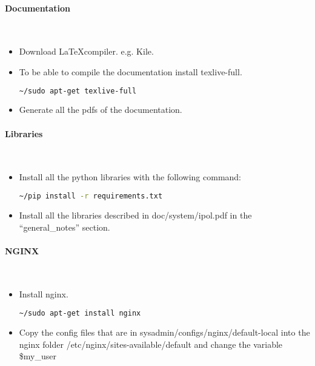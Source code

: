 \paragraph{Documentation} \hspace{0pt} \\
\begin{itemize}
 \item Download \LaTeX compiler. e.g. Kile.
 \item To be able to compile the documentation install texlive-full.
  \begin{lstlisting}[language=Bash]
  ~/sudo apt-get texlive-full
  \end{lstlisting}
 \item Generate all the pdfs of the documentation.
\end{itemize}

\paragraph{Libraries} \hspace{0pt} \\
\begin{itemize}
 \item Install all the python libraries with the following command:
  \begin{lstlisting}[language=Bash]
  ~/pip install -r requirements.txt
  \end{lstlisting}
 \item Install all the libraries described in doc/system/ipol.pdf in the ``general\_notes'' section.
\end{itemize}

\paragraph{NGINX} \hspace{0pt} \\
\begin{itemize}
 \item Install nginx.
  \begin{lstlisting}[language=Bash]
  ~/sudo apt-get install nginx
  \end{lstlisting}
 \item Copy the config files that are in sysadmin/configs/nginx/default-local into the nginx folder /etc/nginx/sites-available/default and change the variable \$my\_user
\end{itemize}

